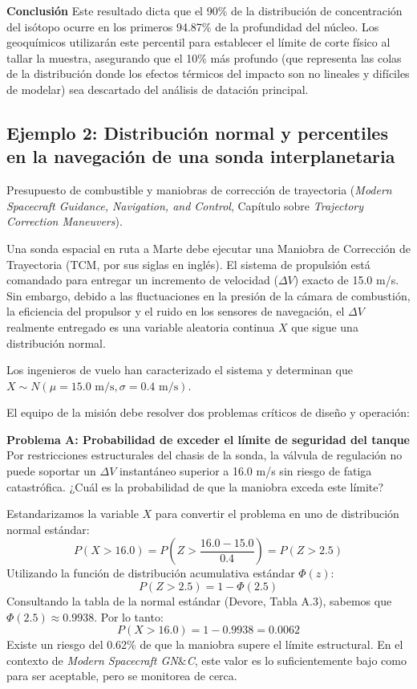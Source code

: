 \textbf{Conclusión}
Este resultado dicta que el 90\% de la distribución de concentración del isótopo ocurre en los primeros 94.87\% de la profundidad del núcleo. Los geoquímicos utilizarán este percentil para establecer el límite de corte físico al tallar la muestra, asegurando que el 10\% más profundo (que representa las colas de la distribución donde los efectos térmicos del impacto son no lineales y difíciles de modelar) sea descartado del análisis de datación principal.

\subsection{Ejemplo 2: Distribución normal y percentiles en la navegación de una sonda interplanetaria}

Presupuesto de combustible y maniobras de corrección de trayectoria (\textit{Modern Spacecraft Guidance, Navigation, and Control}, Capítulo sobre \textit{Trajectory Correction Maneuvers}).

Una sonda espacial en ruta a Marte debe ejecutar una Maniobra de Corrección de Trayectoria (TCM, por sus siglas en inglés). El sistema de propulsión está comandado para entregar un incremento de velocidad ($\Delta V$) exacto de 15.0 m/s. Sin embargo, debido a las fluctuaciones en la presión de la cámara de combustión, la eficiencia del propulsor y el ruido en los sensores de navegación, el $\Delta V$ realmente entregado es una variable aleatoria continua $X$ que sigue una distribución normal.

Los ingenieros de vuelo han caracterizado el sistema y determinan que $X \sim N(\mu = 15.0 \text{ m/s}, \sigma = 0.4 \text{ m/s})$.

El equipo de la misión debe resolver dos problemas críticos de diseño y operación:

\textbf{Problema A: Probabilidad de exceder el límite de seguridad del tanque}
Por restricciones estructurales del chasis de la sonda, la válvula de regulación no puede soportar un $\Delta V$ instantáneo superior a 16.0 m/s sin riesgo de fatiga catastrófica. ¿Cuál es la probabilidad de que la maniobra exceda este límite?

Estandarizamos la variable $X$ para convertir el problema en uno de distribución normal estándar:
$$ P(X > 16.0) = P\left(Z > \frac{16.0 - 15.0}{0.4}\right) = P(Z > 2.5) $$
Utilizando la función de distribución acumulativa estándar $\Phi(z)$:
$$ P(Z > 2.5) = 1 - \Phi(2.5) $$
Consultando la tabla de la normal estándar (Devore, Tabla A.3), sabemos que $\Phi(2.5) \approx 0.9938$. Por lo tanto:
$$ P(X > 16.0) = 1 - 0.9938 = 0.0062 $$
Existe un riesgo del 0.62\% de que la maniobra supere el límite estructural. En el contexto de \textit{Modern Spacecraft GN$\&$C}, este valor es lo suficientemente bajo como para ser aceptable, pero se monitorea de cerca.

